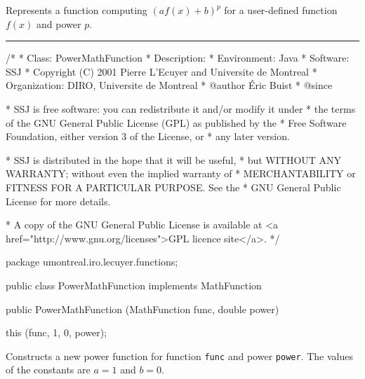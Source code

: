 
Represents a function computing $(af(x) + b)^p$ for a user-defined function
$f(x)$ and power $p$.

\bigskip\hrule

\begin{code}
\begin{hide}
/*
 * Class:        PowerMathFunction
 * Description:  
 * Environment:  Java
 * Software:     SSJ 
 * Copyright (C) 2001  Pierre L'Ecuyer and Universite de Montreal
 * Organization: DIRO, Universite de Montreal
 * @author       Éric Buist
 * @since

 * SSJ is free software: you can redistribute it and/or modify it under
 * the terms of the GNU General Public License (GPL) as published by the
 * Free Software Foundation, either version 3 of the License, or
 * any later version.

 * SSJ is distributed in the hope that it will be useful,
 * but WITHOUT ANY WARRANTY; without even the implied warranty of
 * MERCHANTABILITY or FITNESS FOR A PARTICULAR PURPOSE.  See the
 * GNU General Public License for more details.

 * A copy of the GNU General Public License is available at
   <a href="http://www.gnu.org/licenses">GPL licence site</a>.
 */
\end{hide}
package umontreal.iro.lecuyer.functions;\begin{hide}

\end{hide}

public class PowerMathFunction implements MathFunction\begin{hide}

,
      MathFunctionWithFirstDerivative {
   private MathFunction func;
   private double a, b;
   private double power;
\end{hide}

   public PowerMathFunction (MathFunction func, double power)\begin{hide} {
      this (func, 1, 0, power);
   }\end{hide}
\end{code}
\begin{tabb}   Constructs a new power function for function \texttt{func} and power
 \texttt{power}. The values of the constants are $a=1$ and $b=0$.
\end{tabb}
\begin{htmlonly}
\end{htmlonly}
